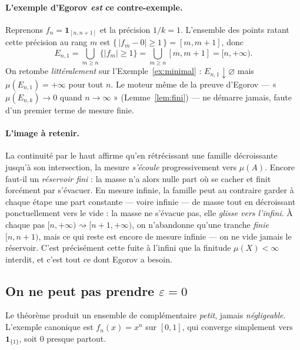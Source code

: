 \documentclass[11pt,a4paper]{article}
\theoremstyle{plain}
\theoremstyle{definition}
\newcommand{\1}{\mathbf{1}}
\newcommand{\ind}[1]{\1_{#1}}
\newcommand{\abs}[1]{\left|#1\right|}
\begin{document}
\paragraph{L'exemple d'Egorov \emph{est} ce contre-exemple.} Reprenons
$f_n=\ind{[n,n+1]}$ et la précision $1/k=1$. L'ensemble des points ratant cette
précision au rang $m$ est $\{\,\abs{f_m-0}\ge1\,\}=[m,m+1]$, donc
\[
  E_{n,1}=\bigcup_{m\ge n}\{\abs{f_m}\ge1\}=\bigcup_{m\ge n}[m,m+1]=[n,+\infty).
\]
On retombe \emph{littéralement} sur l'Exemple~\ref{ex:minimal} :
$E_{n,1}\downarrow\varnothing$ mais $\mu(E_{n,1})=+\infty$ pour tout $n$. Le moteur
même de la preuve d'Egorov --- « $\mu(E_{n,k})\to0$ quand $n\to\infty$ »
(Lemme~\ref{lem:fini}) --- ne démarre jamais, faute d'un premier terme de mesure
finie.

\paragraph{L'image à retenir.} La continuité par le haut affirme qu'en rétrécissant
une famille décroissante jusqu'à son intersection, la mesure \emph{s'écoule}
progressivement vers $\mu(A)$. Encore faut-il un \emph{réservoir fini} : la masse
n'a alors nulle part où se cacher et finit forcément par s'évacuer. En mesure
infinie, la famille peut au contraire garder à chaque étape une part constante ---
voire infinie --- de masse tout en décroissant ponctuellement vers le vide : la
masse ne s'évacue pas, elle \emph{glisse vers l'infini}. À chaque pas
$[n,+\infty)\rightsquigarrow[n+1,+\infty)$, on n'abandonne qu'une tranche
\emph{finie} $[n,n+1)$, mais ce qui reste est encore de mesure infinie --- on ne
vide jamais le réservoir. C'est précisément cette fuite à l'infini que la finitude
$\mu(X)<\infty$ interdit, et c'est tout ce dont Egorov a besoin.

\subsection*{On ne peut pas prendre $\varepsilon=0$}

Le théorème produit un ensemble de complémentaire \emph{petit}, jamais
\emph{négligeable}. L'exemple canonique est $f_n(x)=x^{n}$ sur $[0,1]$, qui converge
simplement vers $\ind{\{1\}}$, soit $0$ presque partout.
\end{document}
